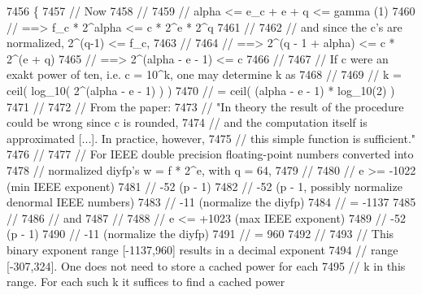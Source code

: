 \begin{DoxyCode}
7456 \{
7457     \textcolor{comment}{// Now}
7458     \textcolor{comment}{//}
7459     \textcolor{comment}{//      alpha <= e\_c + e + q <= gamma                                    (1)}
7460     \textcolor{comment}{//      ==> f\_c * 2^alpha <= c * 2^e * 2^q}
7461     \textcolor{comment}{//}
7462     \textcolor{comment}{// and since the c's are normalized, 2^(q-1) <= f\_c,}
7463     \textcolor{comment}{//}
7464     \textcolor{comment}{//      ==> 2^(q - 1 + alpha) <= c * 2^(e + q)}
7465     \textcolor{comment}{//      ==> 2^(alpha - e - 1) <= c}
7466     \textcolor{comment}{//}
7467     \textcolor{comment}{// If c were an exakt power of ten, i.e. c = 10^k, one may determine k as}
7468     \textcolor{comment}{//}
7469     \textcolor{comment}{//      k = ceil( log\_10( 2^(alpha - e - 1) ) )}
7470     \textcolor{comment}{//        = ceil( (alpha - e - 1) * log\_10(2) )}
7471     \textcolor{comment}{//}
7472     \textcolor{comment}{// From the paper:}
7473     \textcolor{comment}{// "In theory the result of the procedure could be wrong since c is rounded,}
7474     \textcolor{comment}{//  and the computation itself is approximated [...]. In practice, however,}
7475     \textcolor{comment}{//  this simple function is sufficient."}
7476     \textcolor{comment}{//}
7477     \textcolor{comment}{// For IEEE double precision floating-point numbers converted into}
7478     \textcolor{comment}{// normalized diyfp's w = f * 2^e, with q = 64,}
7479     \textcolor{comment}{//}
7480     \textcolor{comment}{//      e >= -1022      (min IEEE exponent)}
7481     \textcolor{comment}{//           -52        (p - 1)}
7482     \textcolor{comment}{//           -52        (p - 1, possibly normalize denormal IEEE numbers)}
7483     \textcolor{comment}{//           -11        (normalize the diyfp)}
7484     \textcolor{comment}{//         = -1137}
7485     \textcolor{comment}{//}
7486     \textcolor{comment}{// and}
7487     \textcolor{comment}{//}
7488     \textcolor{comment}{//      e <= +1023      (max IEEE exponent)}
7489     \textcolor{comment}{//           -52        (p - 1)}
7490     \textcolor{comment}{//           -11        (normalize the diyfp)}
7491     \textcolor{comment}{//         = 960}
7492     \textcolor{comment}{//}
7493     \textcolor{comment}{// This binary exponent range [-1137,960] results in a decimal exponent}
7494     \textcolor{comment}{// range [-307,324]. One does not need to store a cached power for each}
7495     \textcolor{comment}{// k in this range. For each such k it suffices to find a cached power}

\end{DoxyCode}

